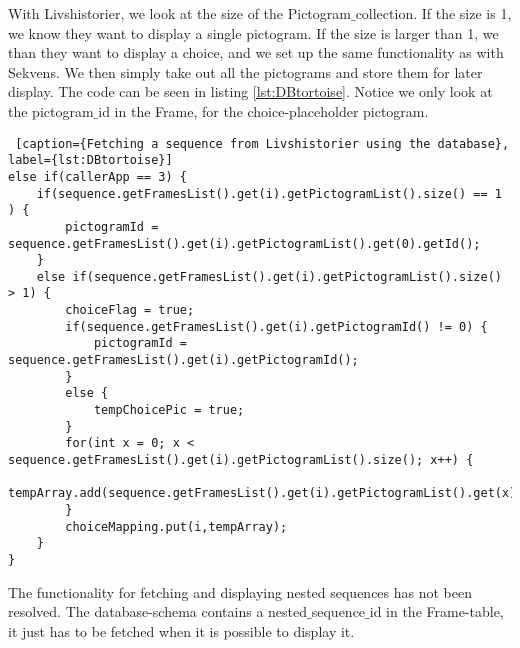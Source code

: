 With Livshistorier, we look at the size of the Pictogram$\_$collection. If the size is 1, we know they want to display a single pictogram. If the size is larger than 1, we than they want to display a choice, and we set up the same functionality as with Sekvens. We then simply take out all the pictograms and store them for later display. The code can be seen in listing \ref{lst:DBtortoise}. Notice we only look at the pictogram$\_$id in the Frame, for the choice-placeholder pictogram.

\begin{lstlisting} [caption={Fetching a sequence from Livshistorier using the database}, label={lst:DBtortoise}]
else if(callerApp == 3) {
	if(sequence.getFramesList().get(i).getPictogramList().size() == 1 ) {
		pictogramId = sequence.getFramesList().get(i).getPictogramList().get(0).getId();
	}
	else if(sequence.getFramesList().get(i).getPictogramList().size() > 1) {
		choiceFlag = true;
		if(sequence.getFramesList().get(i).getPictogramId() != 0) {
			pictogramId = sequence.getFramesList().get(i).getPictogramId();
		} 
		else {
			tempChoicePic = true;
		}
		for(int x = 0; x < sequence.getFramesList().get(i).getPictogramList().size(); x++) {
			tempArray.add(sequence.getFramesList().get(i).getPictogramList().get(x).getId());
		}
		choiceMapping.put(i,tempArray);
	}
}
\end{lstlisting}

The functionality for fetching and displaying nested sequences has not been resolved. The database-schema contains a nested$\_$sequence$\_$id in the Frame-table, it just has to be fetched when it is possible to display it.
